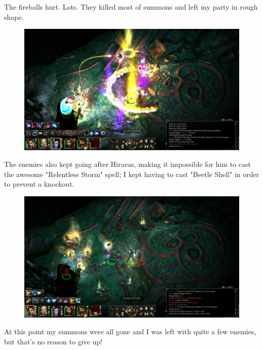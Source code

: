 \documentclass{article}
\begin{document}
The fireballs hurt.  Lots.  They killed most of summons and left my party in rough shape.

\begin{figure}
\includegraphics[scale=0.33]{files/blog/2018_11_25_pillars_of_eternity_path_of_the_damned_act_ii/2018_11_25_fampyr03.jpg}
\end{figure}

The enemies also kept going after Hiravas, making it impossible for him to cast the awesome "Relentless Storm" spell; I kept having to cast "Beetle Shell" in order to prevent a knockout.

\begin{figure}
\includegraphics[scale=0.33]{files/blog/2018_11_25_pillars_of_eternity_path_of_the_damned_act_ii/2018_11_25_fampyr04.jpg}
\end{figure}

At this point my summons were all gone and I was left with quite a few enemies, but that's no reason to give up!
\end{document}
